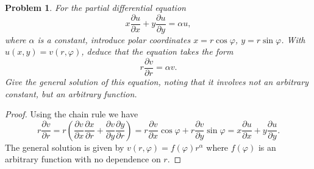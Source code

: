 \documentclass{article}
\newtheorem{problem}{Problem}
\begin{document}
\begin{problem}
For the partial differential equation
\[
x \frac{\partial u}{\partial x} + y \frac{\partial u}{\partial y} = \alpha u,
\]
where $\alpha$ is a constant, introduce polar coordinates $x = r \cos \varphi$, $y = r \sin \varphi$. With $u(x,y) = v(r, \varphi)$, deduce that the equation takes the form
\[
r \frac{\partial v}{\partial r} = \alpha v.
\]
Give the general solution of this equation, noting that it involves not an arbitrary constant, but an arbitrary function.
\end{problem}
\begin{proof}
Using the chain rule we have
\[
r \frac{\partial v}{\partial r} = r \left ( \frac{\partial v}{\partial x} \frac{\partial x}{\partial r} + \frac{\partial v}{\partial y} \frac{\partial y}{\partial r} \right ) = r\frac{\partial v}{\partial x} \cos \varphi + r\frac{\partial v}{\partial y} \sin \varphi = x \frac{\partial u}{\partial x} + y \frac{\partial u}{\partial y}.
\]
The general solution is given by $v(r, \varphi) = f(\varphi) r^{\alpha}$ where $f(\varphi)$ is an arbitrary function with no dependence on $r$.
\end{proof}
\end{document}
